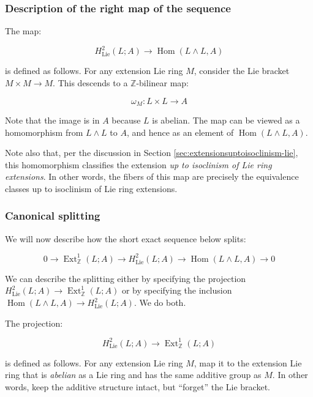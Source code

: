 \documentclass{ucetd}
\begin{document}
\subsubsection{Description of the right map of the sequence}\label{sec:ses-uct-lie-abelian-right-map}

The map:

$$H^2_{\text{Lie}}(L;A) \to \operatorname{Hom}(L \wedge L,A)$$

is defined as follows. For any extension Lie ring $M$, consider the
Lie bracket $M \times M \to M$. This descends to a
$\mathbb{Z}$-bilinear map:

$$\omega_M: L \times L \to A$$

Note that the image is in $A$ because $L$ is abelian. The map can be
viewed as a homomorphism from $L \wedge L$ to $A$, and hence as an
element of $\operatorname{Hom}(L \wedge L,A)$.

Note also that, per the discussion in Section
\ref{sec:extensionsuptoisoclinism-lie}, this homomorphism classifies
the extension {\em up to isoclinism of Lie ring extensions}. In other
words, the fibers of this map are precisely the equivalence classes up
to isoclinism of Lie ring extensions.
\subsubsection{Canonical splitting}\label{sec:ses-uct-lie-abelian-canonical-splitting}

We will now describe how the short exact sequence below splits:

\begin{equation*}
0 \to \operatorname{Ext}^1_{\mathbb{Z}}(L;A) \to H^2_{\text{Lie}}(L;A) \to \operatorname{Hom}(L \wedge L, A) \to 0
\end{equation*}

We can describe the splitting either by specifying the projection
$H^2_{\text{Lie}}(L;A) \to \operatorname{Ext}^1_{\mathbb{Z}}(L;A)$ or by specifying
the inclusion $\operatorname{Hom}(L \wedge L,A) \to H^2_{\text{Lie}}(L;A)$. We do both.

The projection:

$$H^2_{\text{Lie}}(L;A) \to \operatorname{Ext}^1_{\mathbb{Z}}(L;A)$$

is defined as follows. For any extension Lie ring $M$, map it to the
extension Lie ring that is {\em abelian} as a Lie ring and has the
same additive group as $M$. In other words, keep the additive
structure intact, but ``forget'' the Lie bracket.
\end{document}
